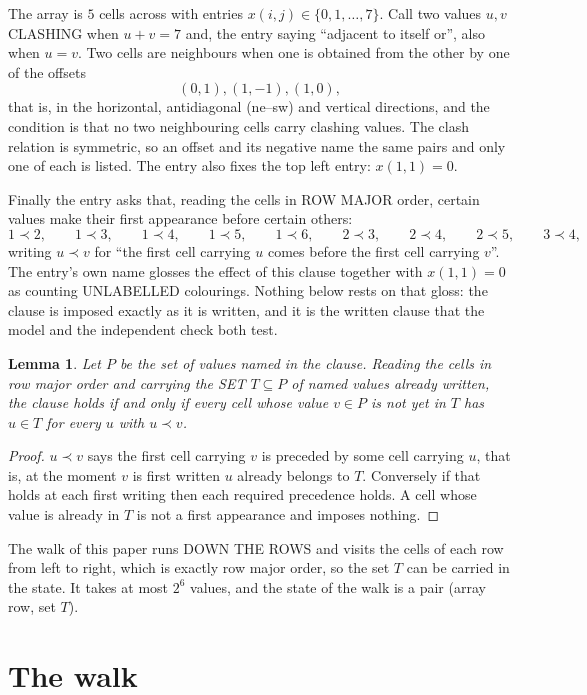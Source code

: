 \documentclass[11pt,a4paper]{article}
\theoremstyle{plain}
\newtheorem{lemma}[theorem]{Lemma}
\theoremstyle{definition}
\begin{document}
The array is $5$ cells across with entries $x(i,j)\in\{0,1,\dots,7\}$. Call two values $u,v$ CLASHING
when $u+v=7$ and, the entry saying ``adjacent to itself or'', also when $u=v$. Two cells are neighbours when one is obtained from the other by one of
the offsets
\[
(0,1), (1,-1), (1,0),
\]
that is, in the horizontal, antidiagonal (ne--sw) and vertical directions, and the condition is that no two neighbouring cells carry
clashing values. The clash relation is symmetric, so an offset and its negative name the
same pairs and only one of each is listed. The entry also fixes the top left entry: $x(1,1)=0$.

Finally the entry asks that, reading the cells in ROW MAJOR order, certain values make their
first appearance before certain others:
\[
1\prec 2,\qquad 1\prec 3,\qquad 1\prec 4,\qquad 1\prec 5,\qquad 1\prec 6,\qquad 2\prec 3,\qquad 2\prec 4,\qquad 2\prec 5,\qquad 3\prec 4 ,
\]
writing $u\prec v$ for ``the first cell carrying $u$ comes before the first cell carrying
$v$''. The entry's own name glosses the effect of this clause together with $x(1,1)=0$ as
counting UNLABELLED colourings. Nothing below rests on that gloss: the clause is imposed
exactly as it is written, and it is the written clause that the model and the independent
check both test.

\begin{lemma}\label{lem:seen}
Let $P$ be the set of values named in the clause. Reading the cells in row major order and
carrying the SET $T\subseteq P$ of named values already written, the clause holds if and only
if every cell whose value $v\in P$ is not yet in $T$ has $u\in T$ for every $u$ with $u\prec v$.
\end{lemma}

\begin{proof}
$u\prec v$ says the first cell carrying $v$ is preceded by some cell carrying $u$, that is, at
the moment $v$ is first written $u$ already belongs to $T$. Conversely if that holds at each
first writing then each required precedence holds. A cell whose value is already in $T$ is not
a first appearance and imposes nothing.
\end{proof}

The walk of this paper runs DOWN THE ROWS and visits the cells of each row from left to right,
which is exactly row major order, so the set $T$ can be carried in the state. It takes at most
$2^{6}$ values, and the state of the walk is a pair (array row, set $T$).

\section{The walk}
\end{document}
